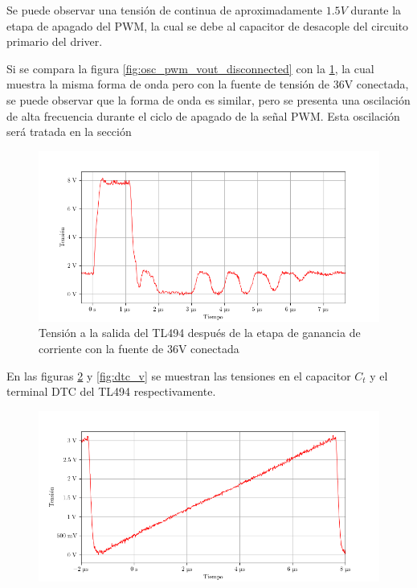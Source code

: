 Se puede observar una tensión de continua de aproximadamente $1.5V$ durante la etapa de apagado del PWM, la cual se debe al capacitor de desacople del circuito primario del driver.

Si se compara la figura \ref{fig:osc_pwm_vout_disconnected} con la \ref{fig:osc_pwm_vout_connected}, la cual muestra la misma forma de onda pero con la fuente de tensión de 36V conectada, se puede observar que la forma de onda es similar, pero se presenta una oscilación de alta frecuencia durante el ciclo de apagado de la señal PWM. Esta oscilación será tratada en la sección %

\begin{figure}[H]
    \centering
    \includegraphics[width=\textwidth]{images/capturas-osciloscopio/TL494/pwm_vout_connected.png}
    \caption{Tensión a la salida del TL494 después de la etapa de ganancia de corriente con la fuente de 36V conectada}
    \label{fig:osc_pwm_vout_connected}
\end{figure}

En las figuras \ref{fig:ct_v} y \ref{fig:dtc_v} se muestran las tensiones en el capacitor $C_t$ y el terminal DTC del TL494 respectivamente.

\begin{figure}[H]
    \centering
    \includegraphics[width=\textwidth]{images/capturas-osciloscopio/TL494/Ct_v.png}
    \caption{} %
    \label{fig:ct_v}
\end{figure}

